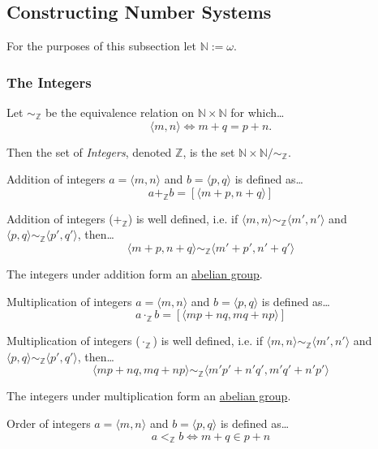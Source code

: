 \subsection{Constructing Number Systems}\label{numberconstructions}

For the purposes of this subsection let $\mathbb{N} := \omega$.

\subsubsection{The Integers}\label{integers}

Let $\sim_{\mathbb{Z}}$ be the equivalence relation on $\mathbb{N} \times \mathbb{N}$ for which\dots
$$\langle m,n \rangle \Leftrightarrow m+q=p+n.$$

\noindent Then the set of \emph{Integers}, denoted $\mathbb{Z}$, is the set $\mathbb{N} \times \mathbb{N} / \sim_{\mathbb{Z}}.$

Addition of integers $a = \langle m, n \rangle$ and $b = \langle p, q \rangle$ is defined as\dots
$$a +_{\mathbb{Z}} b = [\langle m+p, n+q \rangle]$$

\begin{lemma}
Addition of integers ($+_{\mathbb{Z}}$) is well defined, i.e. if $\langle m,n \rangle \sim_{\mathbb{Z}} \langle m',n' \rangle$ and $\langle p,q \rangle \sim_{\mathbb{Z}} \langle p',q' \rangle$, then\dots
$$\langle m + p, n + q \rangle \sim_{\mathbb{Z}} \langle m' + p', n' + q' \rangle$$
\end{lemma}

\noindent The integers under addition form an \hyperref[grouptheory]{abelian group}.

Multiplication of integers $a = \langle m, n \rangle$ and $b = \langle p, q \rangle$ is defined as\dots
$$a \cdot_{\mathbb{Z}} b = [\langle mp + nq, mq + np \rangle]$$

\begin{lemma}
Multiplication of integers ($\cdot_{\mathbb{Z}}$) is well defined, i.e. if $\langle m,n \rangle \sim_{\mathbb{Z}} \langle m',n' \rangle$ and $\langle p,q \rangle \sim_{\mathbb{Z}} \langle p',q' \rangle$, then\dots
$$\langle mp+nq, mq+np \rangle \sim_{\mathbb{Z}} \langle m'p' + n'q', m'q' + n'p' \rangle$$
\end{lemma}

\noindent The integers under multiplication form an \hyperref[grouptheory]{abelian group}.

Order of integers $a = \langle m, n \rangle$ and $b = \langle p, q \rangle$ is defined as\dots
$$a <_{\mathbb{Z}} b \Leftrightarrow m + q \in p + n$$

